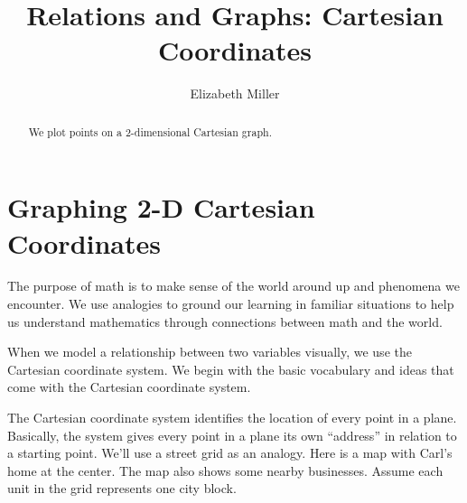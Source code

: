 \documentclass{ximera}
\author{Elizabeth Miller}
\title{Relations and Graphs: Cartesian Coordinates}
\begin{document}
\begin{abstract}
We plot points on a 2-dimensional Cartesian graph.  
\end{abstract}
\maketitle
\licenseORCCA


\section{Graphing 2-D Cartesian Coordinates} 

\begin{MM}
The purpose of math is to make sense of the world around up and phenomena we encounter. We use analogies to ground our learning in familiar situations to help us understand mathematics through connections between math and the world.
\end{MM}

When we model a relationship between two variables visually, we use the Cartesian coordinate system. We begin with the basic vocabulary and ideas that come with the Cartesian coordinate system.

The Cartesian coordinate system identifies the location of every point in a plane. Basically, the system gives every point in a plane its own ``address'' in relation to a starting point. We'll use a street grid as an analogy. Here is a map with Carl's home at the center. The map also shows some nearby businesses. Assume each unit in the grid represents one city block.

\begin{image}
\end{image}
\end{document}
